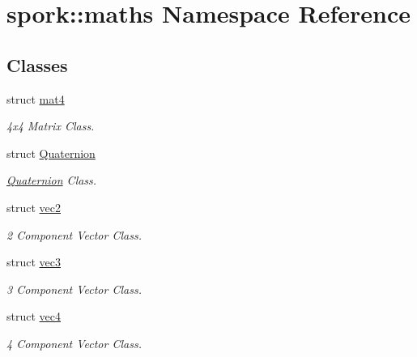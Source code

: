 \hypertarget{namespacespork_1_1maths}{}\section{spork\+:\+:maths Namespace Reference}
\label{namespacespork_1_1maths}
\subsection*{Classes}
\begin{DoxyCompactItemize}
\item 
struct \hyperlink{structspork_1_1maths_1_1mat4}{mat4}
\begin{DoxyCompactList}\small\item\em 4x4 Matrix Class. \end{DoxyCompactList}\item 
struct \hyperlink{structspork_1_1maths_1_1_quaternion}{Quaternion}
\begin{DoxyCompactList}\small\item\em \hyperlink{structspork_1_1maths_1_1_quaternion}{Quaternion} Class. \end{DoxyCompactList}\item 
struct \hyperlink{structspork_1_1maths_1_1vec2}{vec2}
\begin{DoxyCompactList}\small\item\em 2 Component Vector Class. \end{DoxyCompactList}\item 
struct \hyperlink{structspork_1_1maths_1_1vec3}{vec3}
\begin{DoxyCompactList}\small\item\em 3 Component Vector Class. \end{DoxyCompactList}\item 
struct \hyperlink{structspork_1_1maths_1_1vec4}{vec4}
\begin{DoxyCompactList}\small\item\em 4 Component Vector Class. \end{DoxyCompactList}\end{DoxyCompactItemize}
